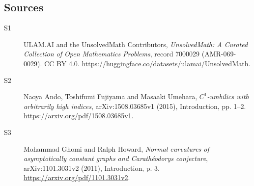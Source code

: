 \documentclass[11pt]{article}
\begin{document}
\subsection{Sources}
\begin{description}
\item[\hypertarget{source:7000029:1}{S1}] ULAM.AI and the UnsolvedMath Contributors, \emph{UnsolvedMath: A Curated Collection of Open Mathematics Problems}, record 7000029 (AMR-069-0029). CC BY 4.0. \url{https://huggingface.co/datasets/ulamai/UnsolvedMath}.
\item[\hypertarget{source:7000029:2}{S2}] Naoya Ando, Toshifumi Fujiyama and Masaaki Umehara, \emph{$C^1$-umbilics with arbitrarily high indices}, arXiv:1508.03685v1 (2015), Introduction, pp. 1--2. \url{https://arxiv.org/pdf/1508.03685v1}.
\item[\hypertarget{source:7000029:3}{S3}] Mohammad Ghomi and Ralph Howard, \emph{Normal curvatures of asymptotically constant graphs and Carath\'eodory\textquotesingle s conjecture}, arXiv:1101.3031v2 (2011), Introduction, p. 3. \url{https://arxiv.org/pdf/1101.3031v2}.
\end{description}
\label{end:7000029}
\end{document}
